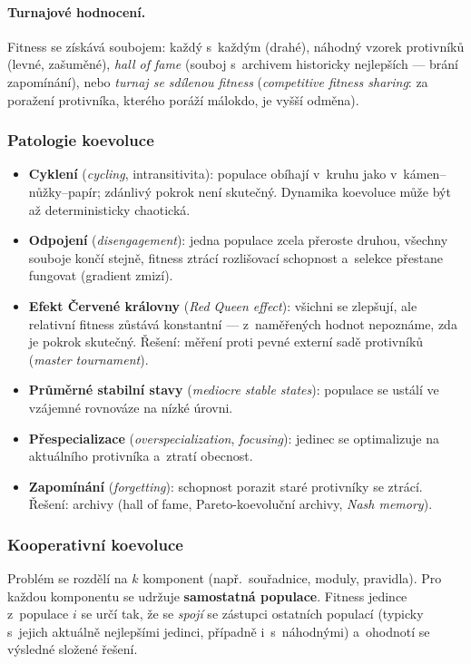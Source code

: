 \documentclass[11pt,a4paper]{article}
\theoremstyle{definition}
\begin{document}
\paragraph{Turnajové hodnocení.} Fitness se získává soubojem: každý s~každým
(drahé), náhodný vzorek protivníků (levné, zašuměné), \emph{hall of fame}
(souboj s~archivem historicky nejlepších --- brání zapomínání), nebo
\emph{turnaj se sdílenou fitness} (\emph{competitive fitness sharing}: za
poražení protivníka, kterého poráží málokdo, je vyšší odměna).

\subsubsection{Patologie koevoluce}

\begin{itemize}
\item \textbf{Cyklení} (\emph{cycling}, intransitivita): populace obíhají
  v~kruhu jako v~kámen--nůžky--papír; zdánlivý pokrok není skutečný.
  Dynamika koevoluce může být až deterministicky chaotická.
\item \textbf{Odpojení} (\emph{disengagement}): jedna populace zcela přeroste
  druhou, všechny souboje končí stejně, fitness ztrácí rozlišovací schopnost
  a~selekce přestane fungovat (gradient zmizí).
\item \textbf{Efekt Červené královny} (\emph{Red Queen effect}): všichni se
  zlepšují, ale relativní fitness zůstává konstantní --- z~naměřených hodnot
  nepoznáme, zda je pokrok skutečný. Řešení: měření proti pevné externí
  sadě protivníků (\emph{master tournament}).
\item \textbf{Průměrné stabilní stavy} (\emph{mediocre stable states}):
  populace se ustálí ve vzájemné rovnováze na nízké úrovni.
\item \textbf{Přespecializace} (\emph{overspecialization}, \emph{focusing}):
  jedinec se optimalizuje na aktuálního protivníka a~ztratí obecnost.
\item \textbf{Zapomínání} (\emph{forgetting}): schopnost porazit staré
  protivníky se ztrácí. Řešení: archivy (hall of fame, Pareto-koevoluční
  archivy, \emph{Nash memory}).
\end{itemize}

\subsubsection{Kooperativní koevoluce}

\begin{defbox}
Problém se rozdělí na $k$ komponent (např.\ souřadnice, moduly, pravidla).
Pro každou komponentu se udržuje \textbf{samostatná populace}. Fitness jedince
z~populace $i$ se určí tak, že se \emph{spojí} se zástupci ostatních populací
(typicky s~jejich aktuálně nejlepšími jedinci, případně i~s~náhodnými)
a~ohodnotí se výsledné složené řešení.
\end{defbox}
\end{document}
